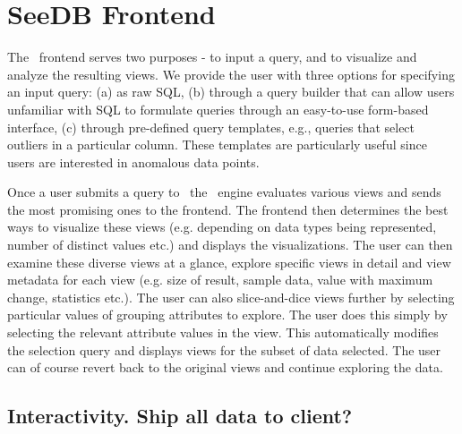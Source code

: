 \section{SeeDB Frontend}
\label{subsec:seedb_frontend}

The \SeeDB\ frontend serves two purposes - to input a query, and to visualize
and analyze the resulting views. We provide the user with three options for
specifying an input query: (a) as raw SQL, (b) through a query builder that can
allow users unfamiliar with SQL to formulate queries through an easy-to-use
form-based interface, (c) through pre-defined query templates, e.g., queries
that select outliers in a particular column. These templates are particularly
useful since users are interested in anomalous data points.

Once a user submits a query to \SeeDB\, the \SeeDB\ engine evaluates various
views and sends the most promising ones to the frontend. The frontend then
determines the best ways to visualize these views (e.g. depending on data types
being represented, number of distinct values etc.) and displays the
visualizations. The user can then examine these diverse views at a glance,
explore specific views in detail and view metadata for each view (e.g. size of
result, sample data, value with maximum change, statistics etc.). The user can
also slice-and-dice views further by selecting particular values of grouping
attributes to explore. The user does this simply by selecting the relevant
attribute values in the view. This automatically modifies the selection query
and displays views for the subset of data selected. The user can of course
revert back to the original views and continue exploring the data.

\subsection{Interactivity. Ship all data to client?}